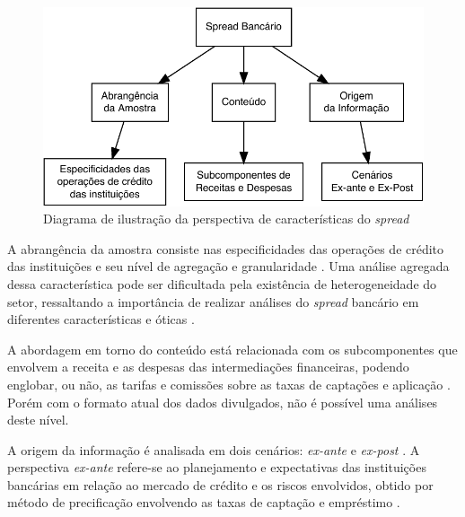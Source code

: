 \documentclass[
  12pt,
  12pt,
  openright,
  oneside,
  a4paper,
  chapter=TITLE,
  section=TITLE,
  subsection=TITLE,
  subsubsection=TITLE,
  english,
  portugues,
  sumario=tradicional]{abntex2}
\begin{document}
\begin{figure}[!htbp]
\vspace{20pt}
\caption{Diagrama de ilustração da perspectiva de características do \emph{spread}}
\vspace{-4mm}

\begin{center}\includegraphics{12-exportedfigures/diagram.spread.carac-1} \end{center}
\vspace{-3mm}
\label{fig:diagramb}
\vspace{-2mm}
\end{figure}

A abrangência da amostra consiste nas especificidades das operações de crédito das instituições e seu nível de agregação e granularidade \cite{costa;nakane:2004}. Uma análise agregada dessa característica pode ser dificultada pela existência de heterogeneidade do setor, ressaltando a importância de realizar análises do \emph{spread} bancário em diferentes características e óticas \cite{block:2000}.

A abordagem em torno do conteúdo está relacionada com os subcomponentes que envolvem a receita e as despesas das intermediações financeiras, podendo englobar, ou não, as tarifas e comissões sobre as taxas de captações e aplicação \cite{block:2000}. Porém com o formato atual dos dados divulgados, não é possível uma análises deste nível.

A origem da informação é analisada em dois cenários: \emph{ex-ante} e \emph{ex-post} \cite{kunt:1999, levine:1997}. A perspectiva \emph{ex-ante} refere-se ao planejamento e expectativas das instituições bancárias em relação ao mercado de crédito e os riscos envolvidos, obtido por método de precificação envolvendo as taxas de captação e empréstimo \cite{durigan:2018, leal:2006, dantas:2012}.
\end{document}
